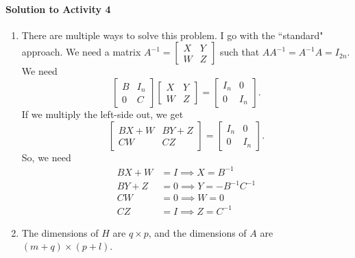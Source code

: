 \paragraph{Solution to Activity 4}
\begin{enumerate}
	\item There are multiple ways to solve this problem. I go with the ``standard" approach. We need a matrix 
		\(A^{-1} = \begin{bmatrix}X & Y \\ W & Z \end{bmatrix}\) such that \(AA^{-1} = A^{-1}A = I_{2n}.\) We need
		\[\begin{bmatrix}B & I_n \\ 0 & C \end{bmatrix}\begin{bmatrix}X & Y \\ W & Z \end{bmatrix} = \begin{bmatrix}I_n & 0 \\ 0 & I_n\end{bmatrix}.\]
		If we multiply the left-side out, we get
		\[\begin{bmatrix}BX + W & BY + Z \\ CW & CZ \end{bmatrix}= \begin{bmatrix}I_n & 0 \\ 0 & I_n\end{bmatrix}.\]
		So, we need
		\begin{align*}
			BX + W &= I \implies X = B^{-1}\\
			BY + Z &= 0 \implies Y = -B^{-1}C^{-1}\\
			CW &= 0 \implies W = 0\\
			CZ &= I \implies Z = C^{-1}
		\end{align*}
	\item The dimensions of \(H\) are \(q \times p\), and the dimensions of \(A\) are \((m + q) \times (p + l)\).


\end{enumerate}
